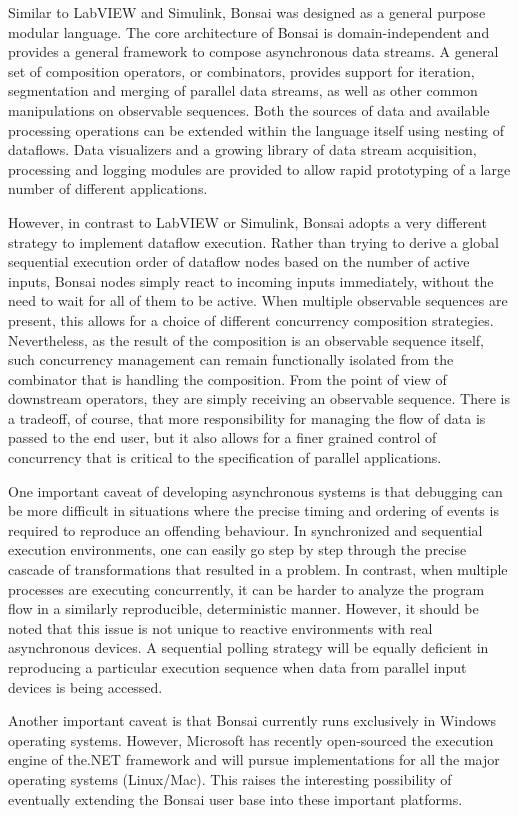 Similar to LabVIEW and Simulink, Bonsai was designed as a general purpose modular language. The core architecture of Bonsai is domain-independent and provides a general framework to compose asynchronous data streams. A general set of composition operators, or combinators, provides support for iteration, segmentation and merging of parallel data streams, as well as other common manipulations on observable sequences. Both the sources of data and available processing operations can be extended within the language itself using nesting of dataflows. Data visualizers and a growing library of data stream acquisition, processing and logging modules are provided to allow rapid prototyping of a large number of different applications.

However, in contrast to LabVIEW or Simulink, Bonsai adopts a very different strategy to implement dataflow execution. Rather than trying to derive a global sequential execution order of dataflow nodes based on the number of active inputs, Bonsai nodes simply react to incoming inputs immediately, without the need to wait for all of them to be active. When multiple observable sequences are present, this allows for a choice of different concurrency composition strategies. Nevertheless, as the result of the composition is an observable sequence itself, such concurrency management can remain functionally isolated from the combinator that is handling the composition. From the point of view of downstream operators, they are simply receiving an observable sequence. There is a tradeoff, of course, that more responsibility for managing the flow of data is passed to the end user, but it also allows for a finer grained control of concurrency that is critical to the specification of parallel applications.

One important caveat of developing asynchronous systems is that debugging can be more difficult in situations where the precise timing and ordering of events is required to reproduce an offending behaviour. In synchronized and sequential execution environments, one can easily go step by step through the precise cascade of transformations that resulted in a problem. In contrast, when multiple processes are executing concurrently, it can be harder to analyze the program flow in a similarly reproducible, deterministic manner. However, it should be noted that this issue is not unique to reactive environments with real asynchronous devices. A sequential polling strategy will be equally deficient in reproducing a particular execution sequence when data from parallel input devices is being accessed.

Another important caveat is that Bonsai currently runs exclusively in Windows operating systems. However, Microsoft has recently open-sourced the execution engine of the.NET framework and will pursue implementations for all the major operating systems (Linux/Mac). This raises the interesting possibility of eventually extending the Bonsai user base into these important platforms.